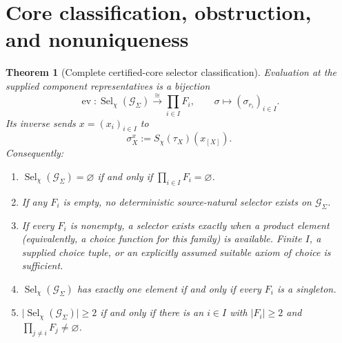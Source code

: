 \documentclass[11pt]{article}
\newtheorem{theorem}{Theorem}
\theoremstyle{definition}
\newcommand{\G}{\mathcal G_{\Sigma}}
\newcommand{\Sel}{\operatorname{Sel}_{\chi}}
\begin{document}
\section{Core classification, obstruction, and nonuniqueness}

\begin{theorem}[Complete certified-core selector classification]
\label{thm:classification}
Evaluation at the supplied component representatives is a bijection
\[
  \operatorname{ev}:\Sel(\G)\xrightarrow{\;\cong\;}
  \prod_{i\in I}F_i,
  \qquad
  \sigma\longmapsto (\sigma_{r_i})_{i\in I}.
\]
Its inverse sends \(x=(x_i)_{i\in I}\) to
\[
  \sigma^x_X:=S_\chi(\tau_X)(x_{[X]}).
\]
Consequently:
\begin{enumerate}[label=(\alph*)]
  \item \(\Sel(\G)=\varnothing\) if and only if
        \(\prod_{i\in I}F_i=\varnothing\).
  \item If any \(F_i\) is empty, no deterministic source-natural selector
        exists on \(\G\).
  \item If every \(F_i\) is nonempty, a selector exists exactly when a
        product element (equivalently, a choice function for this family) is
        available. Finite \(I\), a supplied choice tuple, or an explicitly
        assumed suitable axiom of choice is sufficient.
  \item \(\Sel(\G)\) has exactly one element if and only if every \(F_i\)
        is a singleton.
  \item \(\lvert\Sel(\G)\rvert\geq2\) if and only if there is an
        \(i\in I\) with \(\lvert F_i\rvert\geq2\) and
        \(\prod_{j\neq i}F_j\neq\varnothing\).
\end{enumerate}
\end{theorem}
\end{document}
